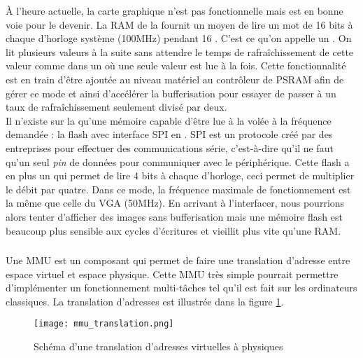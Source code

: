 À l'heure actuelle, la carte graphique n'est pas fonctionnelle mais est en bonne voie pour le devenir. La RAM de la \nexys{} fournit un moyen de lire un mot de 16 bits à chaque  d'horloge système (100MHz) pendant 16 . C'est ce qu'on appelle un . On lit plusieurs valeurs à la suite sans attendre le temps de rafraîchissement de cette valeur comme dans un  où une seule valeur est lue à la fois. Cette fonctionnalité est en train d'être ajoutée au niveau matériel au contrôleur de PSRAM afin de gérer ce mode et ainsi d'accélérer la bufferisation pour essayer de passer à un taux de rafraîchissement seulement divisé par deux.\\

Il n'existe sur la \nexys{} qu'une mémoire capable d'être lue à la volée à la fréquence demandée : la flash avec interface SPI en . SPI est un protocole créé par des entreprises pour effectuer des communications série, c'est-à-dire qu'il ne faut qu'un seul \textit{pin} de données pour communiquer avec le périphérique. Cette flash a en plus un  qui permet de lire 4 bits à chaque  d'horloge, ceci permet de multiplier le débit par quatre. Dans ce mode, la fréquence maximale de fonctionnement est la même que celle du VGA (50MHz). En arrivant à l'interfacer, nous pourrions alors tenter d'afficher des images sans bufferisation mais une mémoire flash est beaucoup plus sensible aux cycles d'écritures et vieillit plus vite qu'une RAM.

\subsubsection{}

Une MMU est un composant qui permet de faire une translation d'adresse entre espace virtuel et espace physique. Cette MMU très simple pourrait permettre d'implémenter un fonctionnement multi-tâches tel qu'il est fait sur les ordinateurs classiques. La translation d'adresses est illustrée dans la figure \ref{memory-management-unit-translation}.

\begin{figure}[h!]
\centering
\texttt{[image: mmu\_translation.png]}
\caption{Schéma d'une translation d'adresses virtuelles à physiques}
\label{memory-management-unit-translation}
\end{figure}

